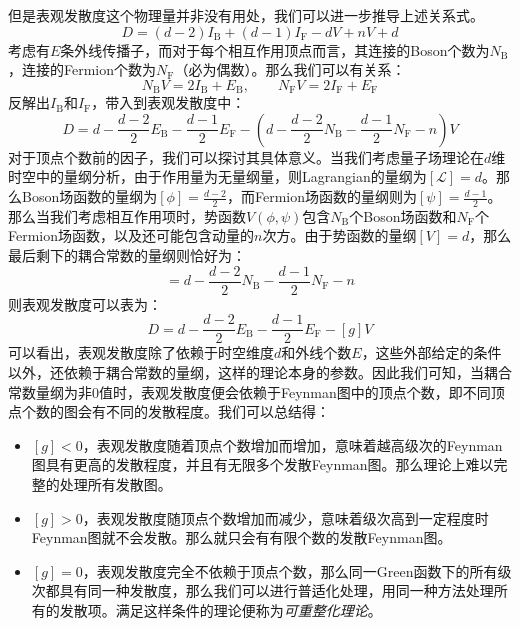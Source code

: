 但是表观发散度这个物理量并非没有用处，我们可以进一步推导上述关系式。
\begin{equation}
D=(d-2)I_\text{B}+(d-1)I_\text{F}-dV+nV+d
\end{equation}
考虑有$E$条外线传播子，而对于每个相互作用顶点而言，其连接的Boson个数为\(N_\text{B}\)，连接的Fermion个数为\(N_{\text{F}}\)（必为偶数）。那么我们可以有关系：
\begin{equation}
N_\text{B}V=2I_\text{B}+E_\text{B},\qquad N_\text{F}V=2I_\text{F}+E_\text{F}
\end{equation}
反解出$I_\text{B}$和$I_{\text{F}}$，带入到表观发散度中：
\begin{equation}
D=d-\frac{d-2}{2}E_\text{B}-\frac{d-1}{2}E_\text{F}-\left(d-\frac{d-2}{2}N_\text{B}-\frac{d-1}{2}N_\text{F}-n\right)V
\end{equation}
对于顶点个数前的因子，我们可以探讨其具体意义。当我们考虑量子场理论在$d$维时空中的量纲分析，由于作用量为无量纲量，则Lagrangian的量纲为$[\mathscr{L}]=d$。那么Boson场函数的量纲为$[\phi]=\frac{d-2}{2}$，而Fermion场函数的量纲则为$[\psi]=\frac{d-1}{2}$。那么当我们考虑相互作用项时，势函数$V(\phi,\psi)$包含$N_\text{B}$个Boson场函数和$N_\text{F}$个Fermion场函数，以及还可能包含动量的$n$次方。由于势函数的量纲$[V]=d$，那么最后剩下的耦合常数的量纲则恰好为：
\begin{equation}
[g]=d-\frac{d-2}{2}N_\text{B}-\frac{d-1}{2}N_\text{F}-n
\end{equation}
则表观发散度可以表为：
\begin{equation}
D=d-\frac{d-2}{2}E_\text{B}-\frac{d-1}{2}E_\text{F}-[g]V
\end{equation}
可以看出，表观发散度除了依赖于时空维度$d$和外线个数$E$，这些外部给定的条件以外，还依赖于耦合常数的量纲，这样的理论本身的参数。因此我们可知，当耦合常数量纲为非0值时，表观发散度便会依赖于Feynman图中的顶点个数，即不同顶点个数的图会有不同的发散程度。我们可以总结得：
\begin{itemize}
	\item \([g]<0\)，表观发散度随着顶点个数增加而增加，意味着越高级次的Feynman图具有更高的发散程度，并且有无限多个发散Feynman图。那么理论上难以完整的处理所有发散图。
	\item \([g]>0\)，表观发散度随顶点个数增加而减少，意味着级次高到一定程度时Feynman图就不会发散。那么就只会有有限个数的发散Feynman图。
	\item \([g]=0\)，表观发散度完全不依赖于顶点个数，那么同一Green函数下的所有级次都具有同一种发散度，那么我们可以进行普适化处理，用同一种方法处理所有的发散项。满足这样条件的理论便称为\emph{可重整化理论}。
\end{itemize}

